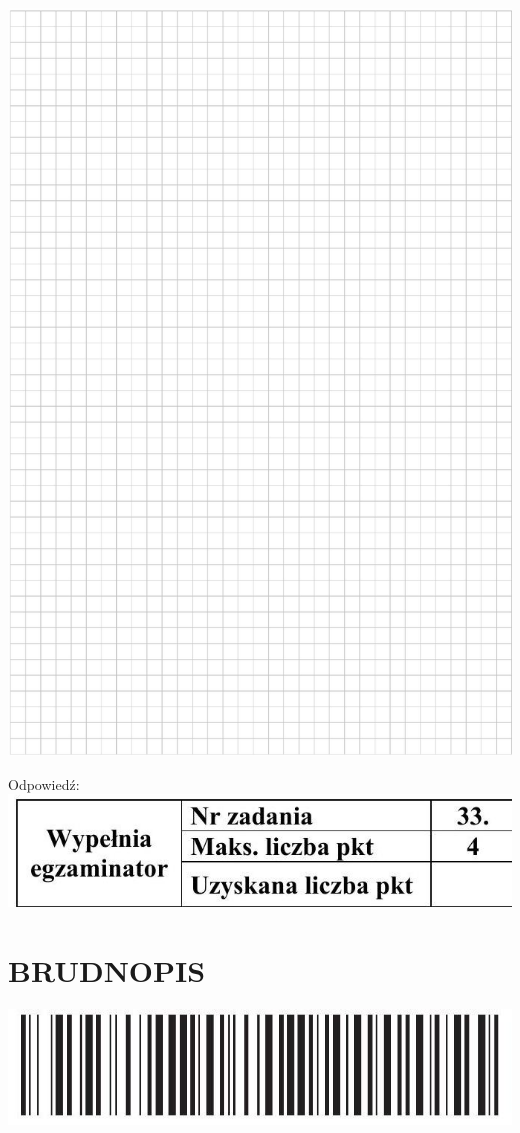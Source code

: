 \documentclass[10pt]{article}
\begin{document}
\includegraphics[max width=\textwidth, center]{2024_11_21_5b6b7ffa9006e3f448adg-19(1)}

Odpowiedź:\\
\includegraphics[max width=\textwidth, center]{2024_11_21_5b6b7ffa9006e3f448adg-19}

\section*{BRUDNOPIS}
\begin{center}
\includegraphics[max width=\textwidth]{2024_11_21_5b6b7ffa9006e3f448adg-21}
\end{center}
\end{document}
